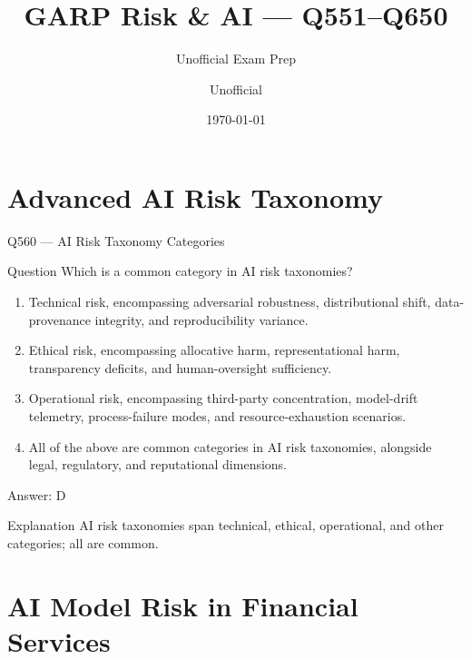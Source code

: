 \documentclass[aspectratio=169,8pt]{beamer}
\title[GARP RAI]{GARP Risk \& AI --- Q551--Q650}
\subtitle{Unofficial Exam Prep}
\author{Unofficial}
\date{\today}
\begin{document}
	
	\begin{frame}
		\titlepage
	\end{frame}
	
	\section{Advanced AI Risk Taxonomy}
	

	
	
	\begin{frame}{Q560 --- AI Risk Taxonomy Categories}
		\begin{block}{Question}
			Which is a common category in AI risk taxonomies?
			\begin{enumerate}
				\item Technical risk, encompassing adversarial robustness, distributional shift, data-provenance integrity, and reproducibility variance.
				\item Ethical risk, encompassing allocative harm, representational harm, transparency deficits, and human-oversight sufficiency.
				\item Operational risk, encompassing third-party concentration, model-drift telemetry, process-failure modes, and resource-exhaustion scenarios.
				\item All of the above are common categories in AI risk taxonomies, alongside legal, regulatory, and reputational dimensions.
			\end{enumerate}
		\end{block}
		\begin{exampleblock}{Answer: D}\end{exampleblock}
		\begin{block}{Explanation}
			AI risk taxonomies span technical, ethical, operational, and other categories; all are common.
		\end{block}
	\end{frame}
	
	\section{AI Model Risk in Financial Services}
	
\end{document}
